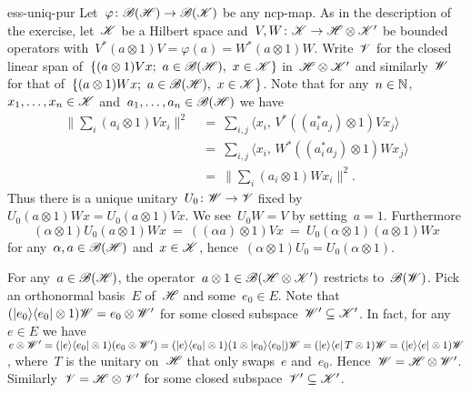 \begin{solution}{ess-uniq-pur}%
Let~$\varphi\colon \mathscr{B}(\mathscr{H}) \to \mathscr{B}(\mathscr{K})$ be any ncp-map.
As in the description of the exercise,
    let~$\mathscr{K}$ be a Hilbert space
    and~$V,W\colon \mathscr{K} \to \mathscr{H} \otimes \mathscr{K}'$
    be bounded operators
    with~$V^* (a \otimes 1) V = \varphi(a) = W^* (a\otimes 1) W$.
Write~$\mathscr{V}$ for the closed linear span
    of~$\{(a \otimes 1) V x; \ a \in \mathscr{B}(\mathscr{H}),\ x \in \mathscr{K}\}$
        in~$\mathscr{H}\otimes \mathscr{K}'$
and similarly~$\mathscr{W}$ for that
    of~$\{(a \otimes 1) W x; \ a \in \mathscr{B}(\mathscr{H}),\ x \in \mathscr{K}\}$.
Note that for any~$n\in \mathbb{N}$, ~$x_1,\ldots, x_n \in \mathscr{K}$
    and~$a_1, \ldots, a_n \in \mathscr{B}(\mathscr{H})$ we have
\begin{align*}
    \bigl\| \sum_i (a_i\otimes1) V x_i \bigr\|^2
    &\ = \ 
     \sum_{i,j} \langle x_i,\, V^* ((a_i^*a_j) \otimes 1) V x_j\rangle \\
    &\ = \ 
     \sum_{i,j} \langle x_i,\, W^* ((a_i^*a_j) \otimes 1) W x_j\rangle \\
     &\ = \ 
    \bigl\| \sum_i (a_i\otimes1) W x_i \bigr\|^2.
\end{align*}
Thus there is a unique unitary~$U_0\colon \mathscr{W} \to \mathscr{V}$
    fixed by~$U_0 (a \otimes 1) W x = U_0 (a \otimes 1) V x$.
We see~$U_0 W = V$ by setting~$a=1$.
Furthermore
    \begin{equation*}
        (\alpha \otimes 1) U_0 (a \otimes 1) W x
        \ = \ ((\alpha a)  \otimes 1) V x
        \ = \ U_0 (\alpha  \otimes 1 )(a  \otimes 1) W x
    \end{equation*}
    for any~$\alpha,a \in \mathscr{B}(\mathscr{H})$ and~$x \in \mathscr{K}$,
    hence~$(\alpha \otimes 1) U_0 = U_0 (\alpha \otimes 1)$.

For any~$a \in \mathscr{B}(\mathscr{H})$,
    the operator~$a \otimes 1 \in \mathscr{B}(\mathscr{H} \otimes \mathscr{K}')$
    restricts to~$\mathscr{B}(\mathscr{W})$.
Pick an orthonormal basis~$E$ of~$\mathscr{H}$
    and some~$e_0 \in E$.
    Note that~$(\left|e_0\right>\!\left<e_0\right| \otimes 1) \mathscr{W} = e_0 \otimes \mathscr{W}'$
    for some closed subspace~$\mathscr{W}' \subseteq \mathscr{K}'$.
In fact, for any~$e \in E$
    we have~$e \otimes \mathscr{W}'
    = (\left|e\right>\!\left<e_0\right| \otimes 1) (e_0 \otimes \mathscr{W}')
    = (\left|e\right>\!\left<e_0\right|\otimes 1)  (1 \otimes \left|e_0\right>\!\left<e_0\right|) \mathscr{W}
    = (\left|e\right>\!\left<e\right| T \otimes 1)  \mathscr{W} = (\left|e\right>\!\left<e\right| \otimes 1) \mathscr{W}$,
    where~$T$ is the unitary on~$\mathscr{H}$ that only swaps~$e$ and~$e_0$.
Hence~$\mathscr{W} = \mathscr{H} \otimes \mathscr{W}'$.
Similarly~$\mathscr{V} = \mathscr{H} \otimes \mathscr{V}'$
    for some closed subspace~$\mathscr{V}' \subseteq \mathscr{K}'$.


\end{solution}
